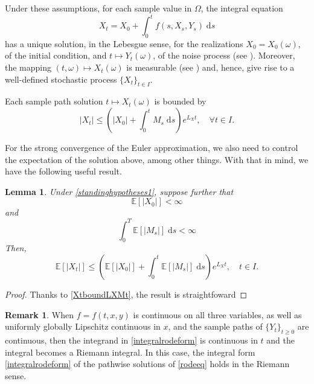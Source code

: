 \documentclass[reqno,12pt]{amsart}
\theoremstyle{plain}%
\newtheorem{lem}{Lemma}[section]
\theoremstyle{definition}
\newtheorem{rmk}{Remark}[section]
\begin{document}
Under these assumptions, for each sample value in $\Omega$, the integral equation
\begin{equation}
    \label{integralrodeform}
    X_t = X_0 + \int_0^t f(s, X_s, Y_s) \;\mathrm{d}s
\end{equation}
has a unique solution, in the Lebesgue sense, for the realizations $X_0 = X_0(\omega)$, of the initial condition, and $t\mapsto Y_t(\omega)$, of the noise process (see \cite[Theorem 1.1]{CoddingtonLevinson1985}). Moreover, the mapping $(t, \omega) \mapsto X_t(\omega)$ is measurable (see \cite[Section 2.1.2]{HanKloeden2017}) and, hence, give rise to a well-defined stochastic process $\{X_t\}_{t\in I}$.

Each sample path solution $t \mapsto X_t(\omega)$ is bounded by
\begin{equation}
    \label{XtboundLXMt}
    |X_t| \leq \left(|X_0| + \int_0^t M_s\;\mathrm{d}s\right) e^{L_X t}, \quad \forall t\in I.
\end{equation}

For the strong convergence of the Euler approximation, we also need to control the expectation of the solution above, among other things. With that in mind, we have the following useful result.

\begin{lem}
    Under \cref{standinghypotheses1}, suppose further that
    \begin{equation}
        \label{EX0strongbound}
        \mathbb{E}[|X_0|] < \infty
    \end{equation}
    and
    \begin{equation}
        \label{EMtstrongbound}
        \int_0^T \mathbb{E}[|M_s|] \;\mathrm{d}s < \infty
    \end{equation}
    Then,
    \begin{equation}
        \label{EXtstrongbound}
        \mathbb{E}[|X_t|] \leq \left(\mathbb{E}[|X_0|] + \int_0^t \mathbb{E}[|M_s|]\;\mathrm{d}s\right) e^{L_X t}, \quad t\in I.
    \end{equation}
\end{lem}

\begin{proof}
    Thanks to \eqref{XtboundLXMt}, the result is straightfoward
\end{proof}

\begin{rmk}
    When $f=f(t, x, y)$ is continuous on all three variables, as well as uniformly globally Lipschitz continuous in $x$, and the sample paths of $\{Y_t\}_{t\geq 0}$ are continuous, then the integrand in \eqref{integralrodeform} is continuous in $t$ and the integral becomes a Riemann integral. In this case, the integral form \eqref{integralrodeform} of the pathwise solutions of \eqref{rodeeq} holds in the Riemann sense.
\end{rmk}
\end{document}
